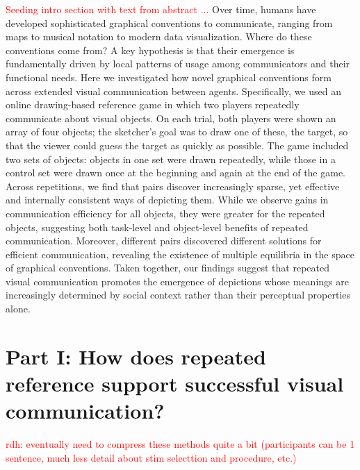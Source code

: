 \documentclass[10pt,letterpaper]{article}
\newcommand{\red}[1]{\textcolor{Red}{#1}}
\newcommand{\rdh}[1]{\textcolor{Red}{rdh: #1}}
\begin{document}
\red{Seeding intro section with text from abstract ...}
Over time, humans have developed sophisticated graphical conventions to communicate, ranging from maps to musical notation to modern data visualization. Where do these conventions come from? A key hypothesis is that their emergence is fundamentally driven by local patterns of usage among communicators and their functional needs. Here we investigated how novel graphical conventions form across extended visual communication between agents. Specifically, we used an online drawing-based reference game in which two players repeatedly communicate about visual objects. On each trial, both players were shown an array of four objects; the sketcher’s goal was to draw one of these, the target, so that the viewer could guess the target as quickly as possible. The game included two sets of objects: objects in one set were drawn repeatedly, while those in a control set were drawn once at the beginning and again at the end of the game. Across repetitions, we find that pairs discover increasingly sparse, yet effective and internally consistent ways of depicting them. While we observe gains in communication efficiency for all objects, they were greater for the repeated objects, suggesting both task-level and object-level benefits of repeated communication. Moreover, different pairs discovered different solutions for efficient communication, revealing the existence of multiple equilibria in the space of graphical conventions. Taken together, our findings suggest that repeated visual communication promotes the emergence of depictions whose meanings are increasingly determined by social context rather than their perceptual properties alone.






\section{Part I: How does repeated reference support successful visual communication?}

\rdh{eventually need to compress these methods quite a bit (participants can be 1 sentence, much less detail about stim selecttion and procedure, etc.)} 
\end{document}
